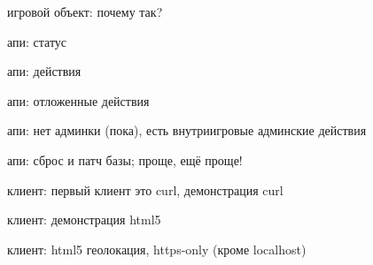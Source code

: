 \documentclass[aspectratio=169,handout,bigger]{beamer}
\begin{document}

\begin{frame}{игровой объект: почему так?}
\end{frame}


\begin{frame}{апи: статус}
\end{frame}


\begin{frame}{апи: действия}
\end{frame}


\begin{frame}{апи: отложенные действия}
\end{frame}


\begin{frame}{апи: нет админки (пока), есть внутриигровые админские действия}
\end{frame}


\begin{frame}{апи: сброс и патч базы; проще, ещё проще!}
\end{frame}


\begin{frame}{клиент: первый клиент это curl, демонстрация curl}
\end{frame}


\begin{frame}{клиент: демонстрация html5}
\end{frame}


\begin{frame}{клиент: html5 геолокация, https-only (кроме localhost)}
\end{frame}
\end{document}
